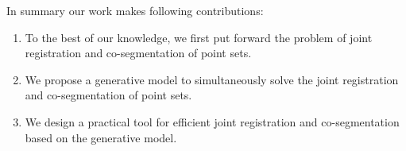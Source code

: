 In summary our work makes following contributions: 
\begin{enumerate}
	\item To the best of our knowledge, we first put forward the problem of joint registration and co-segmentation of point sets.
	
	\item We propose a generative model to simultaneously solve the joint registration and co-segmentation of point sets.
	
	\item We design a practical tool for efficient joint registration and co-segmentation based on the generative model. 
	
\end{enumerate}